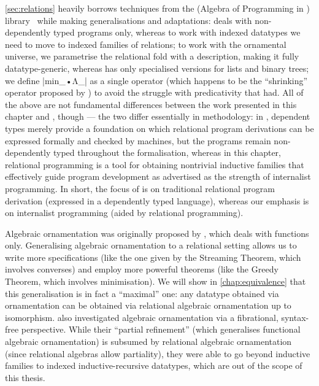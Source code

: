 \autoref{sec:relations} heavily borrows techniques from the  (Algebra of Programming in \Agda) library~\citep{Mu-AoPA} while making generalisations and adaptations:
 deals with non-dependently typed programs only, whereas to work with indexed datatypes we need to move to indexed families of relations; to work with the ornamental universe, we parametrise the relational fold with a description, making it fully datatype-generic, whereas  has only specialised versions for lists and binary trees; we define |min_•Λ_| as a single operator (which happens to be the ``shrinking'' operator proposed by \citet{Mu-Galois}) to avoid the struggle with predicativity that  had.
All of the above are not fundamental differences between the work presented in this chapter and , though --- the two differ essentially in methodology: in , dependent types merely provide a foundation on which relational program derivations can be expressed formally and checked by machines, but the programs remain non-dependently typed throughout the formalisation, whereas in this chapter, relational programming is a tool for obtaining nontrivial inductive families that effectively guide program development as advertised as the strength of internalist programming.
In short, the focus of  is on traditional relational program derivation (expressed in a dependently typed language), whereas our emphasis is on internalist programming (aided by relational programming).

Algebraic ornamentation was originally proposed by \citet{McBride-ornaments}, which deals with functions only.
Generalising algebraic ornamentation to a relational setting allows us to write more specifications (like the one given by the Streaming Theorem, which involves converses) and employ more powerful theorems (like the Greedy Theorem, which involves minimisation).
We will show in \autoref{chap:equivalence} that this generalisation is in fact a ``maximal'' one: any datatype obtained via ornamentation can be obtained via relational algebraic ornamentation up to isomorphism.
\citet{Atkey-refining-inductive-types} also investigated algebraic ornamentation via a fibrational, syntax-free perspective.
While their ``partial refinement'' (which generalises functional algebraic ornamentation) is subsumed by relational algebraic ornamentation (since relational algebras allow partiality), they were able to go beyond inductive families to indexed inductive-recursive datatypes, which are out of the scope of this thesis.

